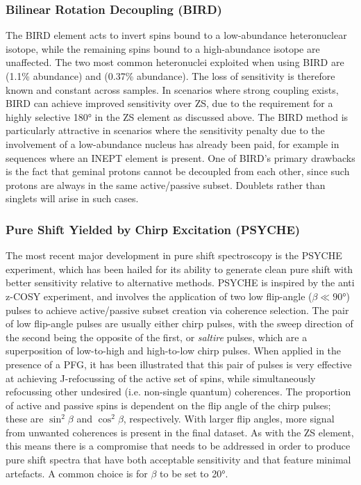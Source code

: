 \subsubsection{Bilinear Rotation Decoupling (BIRD)}
The \ac{BIRD} element acts to invert spins bound to a low-abundance
heteronuclear isotope, while the remaining spins bound to a high-abundance
isotope are unaffected\cite{Garbow1982,Bax1983}.
The two most common heteronuclei exploited when using \ac{BIRD} are 
(1.1\% abundance) and  (0.37\% abundance). The loss of sensitivity
is therefore known and constant across samples. In scenarios where strong
coupling exists, \ac{BIRD} can achieve improved sensitivity over \ac{ZS}, due
to the requirement for a highly selective \ang{180} in the \ac{ZS} element as
discussed above.
The \ac{BIRD} method is particularly attractive in scenarios where the
sensitivity penalty due to the involvement of a low-abundance nucleus has
already been paid, for example in sequences where an \ac{INEPT} element is
present\cite{Paudel2013}. One of \ac{BIRD}'s primary drawbacks is the fact that
geminal protons cannot be decoupled from each other, since such protons are
always in the same active/passive subset. Doublets rather than singlets will
arise in such cases.

\subsubsection{Pure Shift Yielded by Chirp Excitation (PSYCHE)}
\label{subsec:psyche}
The most recent major development in pure shift spectroscopy is the \ac{PSYCHE}
experiment\cite{Foroozandeh2014,Foroozandeh2018}, which has been hailed for its
ability to generate clean pure shift with better sensitivity relative to
alternative methods. \ac{PSYCHE} is inspired by
the anti z-\ac{COSY} experiment\cite{Thrippleton2003}, and involves the application
of two low flip-angle ($\beta \ll \ang{90}$) pulses to achieve active/passive
subset creation via coherence selection. The pair of low flip-angle pulses
are usually either chirp pulses, with the sweep direction of the second being
the opposite of the first, or \emph{saltire} pulses, which are a superposition
of low-to-high and high-to-low chirp pulses. When applied in the presence of a
\ac{PFG}, it has been illustrated that this pair of pulses is very effective at
achieving J-refocussing of the active set of spins, while simultaneously
refocussing other undesired (i.e. non-single quantum) coherences.
The proportion of active and passive spins is dependent on the flip angle of
the chirp pulses; these are $\sin^2 \beta$ and $\cos^2 \beta$,
respectively. With larger flip angles, more signal from unwanted
coherences is present in the final dataset. As with the \ac{ZS} element, this
means there is a compromise that needs to be addressed in order to produce
pure shift spectra that have both acceptable sensitivity and that feature
minimal artefacts. A common choice is for $\beta$ to be set to \ang{20}.

